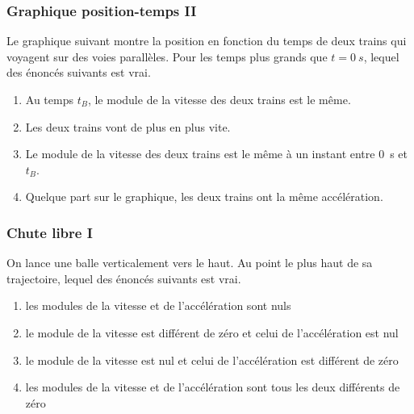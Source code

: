 \documentclass{beamer}
\begin{document}
\begin{frame}
  \frametitle{Graphique position-temps II}

  Le graphique suivant montre la position en fonction du temps de deux trains
  qui voyagent sur des voies parallèles.  Pour les temps plus grands que $t =
  \SI{0}{s}$, lequel des énoncés suivants est vrai.

  \begin{center}
  \end{center}

  \begin{enumerate}
    \item Au temps $t_B$, le module de la vitesse des deux trains est le même.
    \item Les deux trains vont de plus en plus vite.
    \item \alert<2>{Le module de la vitesse des deux trains est le même à un
        instant entre \SI{0}{s} et $t_B$.}
    \item Quelque part sur le graphique, les deux trains ont la même
      accélération.
  \end{enumerate}

\end{frame}

\begin{frame}
  \frametitle{Chute libre I}

  On lance une balle verticalement vers le haut.  Au point le plus haut de sa
  trajectoire, lequel des énoncés suivants est vrai.

  \begin{enumerate}
    \item les modules de la vitesse et de l'accélération sont nuls
    \item le module de la vitesse est différent de zéro et celui de
      l'accélération est nul
    \item \alert<2>{le module de la vitesse est nul et celui de l'accélération
        est différent de zéro}
    \item les modules de la vitesse et de l'accélération sont tous les deux
      différents de zéro
  \end{enumerate}
\end{frame}
\end{document}
